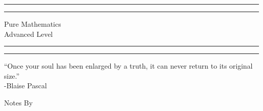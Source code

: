 \documentclass[12pt, a4paper]{report}
\date{} %
\theoremstyle{definition}
\begin{document}
	\begin{titlepage} %
		
		\centering %
		
		\scshape %
		
		\vspace*{\baselineskip} %
		
		
		\rule{\textwidth}{1.6pt}\vspace*{-\baselineskip}\vspace*{2pt} %
		\rule{\textwidth}{0.4pt} %
		
		\vspace{0.75\baselineskip} %
		
		{\LARGE Pure Mathematics\\Advanced Level} %
		
		\vspace{0.75\baselineskip} %
		
		\rule{\textwidth}{0.4pt}\vspace*{-\baselineskip}\vspace{3.2pt} %
		\rule{\textwidth}{1.6pt} %
		
		\vspace{2\baselineskip} %
		
		
		“Once your soul has been enlarged by a truth, it can never return to its original size.”\\
		-Blaise Pascal%
		
		\vspace*{3\baselineskip} %
		
		
		Notes By
		
		\vspace{0.5\baselineskip} %
		

\end{titlepage}
\end{document}
